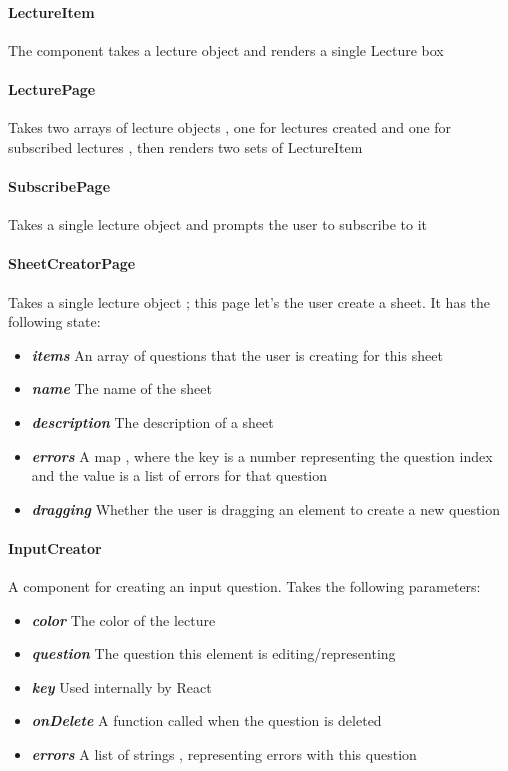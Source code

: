 \paragraph{LectureItem} The component takes a lecture object and renders a single Lecture box
\paragraph{LecturePage} Takes two arrays of lecture objects , one for lectures created and one for subscribed lectures , then renders two sets of LectureItem
\paragraph{SubscribePage} Takes a single lecture object and prompts the user to subscribe to it
\paragraph{SheetCreatorPage} Takes a single lecture object ; this page let's the user create a sheet. It has the following state:
\begin{itemize}
	\item \textit{\textbf{items}} An array of questions that the user is creating for this sheet
	\item \textit{\textbf{name}} The name of the sheet
	\item \textit{\textbf{description}} The description of a sheet
	\item \textit{\textbf{errors}} A map , where the key is a number representing the question index and the value is a list of errors for that question
	\item \textit{\textbf{dragging}} Whether the user is dragging an element to create a new question
\end{itemize}
\paragraph{InputCreator} A component for creating an input question. Takes the following parameters:
\begin{itemize}
	\item \textit{\textbf{color}} The color of the lecture
	\item \textit{\textbf{question}} The question this element is editing/representing
	\item \textit{\textbf{key}} Used internally by React
	\item \textit{\textbf{onDelete}} A function called when the question is deleted
	\item \textit{\textbf{errors}} A list of strings , representing errors with this question
\end{itemize}

